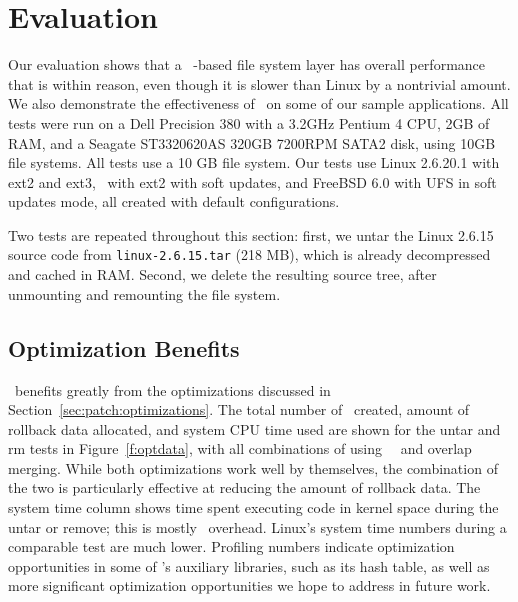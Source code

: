 \section {Evaluation}
\label{sec:evaluation}

Our evaluation shows that a \Kudos\ \patch-based file system layer has
overall performance that is within reason, even though it is slower than
Linux by a nontrivial amount.  We also demonstrate the effectiveness of
\opgroups\ on some of our sample applications. All tests were run on a Dell
Precision 380 with a 3.2GHz Pentium 4 CPU, 2GB of RAM, and a Seagate
ST3320620AS 320GB 7200RPM SATA2 disk, using 10GB file systems.
%
All tests use a 10 GB file system.
%
Our tests use Linux 2.6.20.1 with ext2 and ext3, \Kudos\ with ext2 with
soft updates, and FreeBSD 6.0 with UFS in soft updates mode, all created
with default configurations.

Two tests are repeated throughout this section: first, we untar
the Linux 2.6.15 source code from \texttt{linux-2.6.15.tar} (218 MB), which is
already decompressed and cached in RAM. Second, we delete the resulting source
tree, after unmounting and remounting the file system.

\subsection {Optimization Benefits}

\Kudos\ benefits greatly from the optimizations discussed in
Section~\ref{sec:patch:optimizations}. The total number of \chdescs\ created,
amount of rollback data allocated, and system CPU time used are shown for the
untar and rm tests in Figure~\ref{f:optdata}, with all combinations of using
\nrb\ \chdescs\ and overlap merging. While both optimizations work well by
themselves, the combination of the two is particularly effective at reducing the
amount of rollback data.
%
The system time column shows time spent executing code in kernel space
during the untar or remove; this is mostly \Dodder\ overhead.  Linux's
system time numbers during a comparable test are much lower.  Profiling
numbers indicate optimization opportunities in some of \Dodder's auxiliary
libraries, such as its hash table, as well as more significant optimization
opportunities we hope to address in future work.


